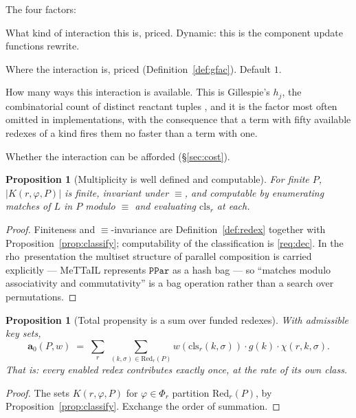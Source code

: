 \documentclass[11pt,a4paper]{article}
\theoremstyle{plain}
\newtheorem{proposition}[theorem]{Proposition}
\theoremstyle{definition}
\theoremstyle{remark}
\newcommand{\rhoc}{\textsf{rho}}
\newcommand{\Red}{\mathrm{Red}}
\newcommand{\prop}{\mathbf{a}}
\newcommand{\wmap}{w}
\newcommand{\gfac}{g}
\newcommand{\class}{\mathrm{cls}}
\begin{document}
The four factors:
\begin{description}[leftmargin=1.6em,style=nextline]
\item[$\wmap(\varphi)$ --- the rate constant.] What kind of interaction this is, priced. Dynamic:
this is the component update functions rewrite.
\item[$\gfac(k)$ --- the geometric factor.] Where the interaction is, priced
(Definition~\ref{def:gfac}). Default $1$.
\item[The cardinality of the sum --- multiplicity.] How many ways this interaction is available.
This is Gillespie's $h_j$, the combinatorial count of distinct reactant tuples \cite{gillespie77},
and it is the factor most often omitted in implementations, with the consequence that a term with
fifty available redexes of a kind fires them no faster than a term with one.
\item[$\chi$ --- the funding gate.] Whether the interaction can be afforded (\S\ref{sec:cost}).
\end{description}

\begin{proposition}[Multiplicity is well defined and computable]
\label{prop:multiplicity}
For finite $P$, $|K(r,\varphi,P)|$ is finite, invariant under $\equiv$, and computable by enumerating
matches of $L$ in $P$ modulo $\equiv$ and evaluating $\class_r$ at each.
\end{proposition}

\begin{proof}
Finiteness and $\equiv$-invariance are Definition~\ref{def:redex} together with
Proposition~\ref{prop:classify}; computability of the classification is \ref{req:dec}. In the \rhoc\
presentation the multiset structure of parallel composition is carried explicitly --- MeTTaIL
represents $\texttt{PPar}$ as a hash bag \cite{mettail} --- so ``matches modulo associativity and
commutativity'' is a bag operation rather than a search over permutations.
\end{proof}

\begin{proposition}[Total propensity is a sum over funded redexes]
\label{prop:total}
With admissible key sets,
\[
\prop_0(P,\wmap) \;=\; \sum_{r}\;\sum_{(k,\sigma)\in\Red_r(P)} \wmap(\class_r(k,\sigma))\cdot\gfac(k)\cdot\chi(r,k,\sigma).
\]
That is: every enabled redex contributes exactly once, at the rate of its own class.
\end{proposition}

\begin{proof}
The sets $K(r,\varphi,P)$ for $\varphi \in \Phi_r$ partition $\Red_r(P)$, by
Proposition~\ref{prop:classify}. Exchange the order of summation.
\end{proof}
\end{document}

